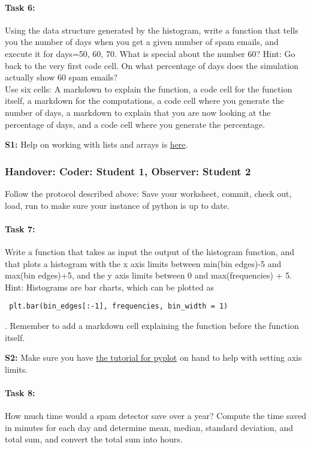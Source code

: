 \documentclass{article}
\begin{document}
\paragraph{Task 6:} Using the data structure generated by the histogram, write a function that tells you the number of days when you get a given number of spam emails, and execute it for days=50, 60, 70. What is special about the number 60? Hint: Go back to the very first code cell. On what percentage of days does the simulation actually show 60 spam emails?   \\
Use six cells: A markdown to explain the function, a code cell for the function itself, a markdown for the computations, a code cell where you generate the number of days, a markdown to explain that you are now looking at the percentage of days, and a code cell where you generate the percentage. 

\textbf{S1:} Help on working with lists and arrays is \href{https://docs.python.org/2/tutorial/datastructures.html#more-on-lists}{here}.


\subsubsection*{Handover: Coder: Student 1, Observer: Student 2}
Follow the protocol described above: Save your worksheet, commit, check out, load, run to make sure your instance of python is up to date. 

\paragraph{Task 7:} Write a function that takes as input the output of the histogram function, and that plots a histogram with the x axis limits between min(bin edges)-5 and max(bin edges)+5, and the y axis limits between 0 and max(frequencies) + 5.\\
Hint: Histograms are bar charts, which can be plotted as \begin{verbatim} plt.bar(bin_edges[:-1], frequencies, bin_width = 1) \end{verbatim}. Remember to add a markdown cell explaining the function before the function itself.

\textbf{S2:} Make sure you have \href{http://matplotlib.org/users/pyplot_tutorial.html}{the tutorial for pyplot} on hand to help with setting axis limits. 

\paragraph{Task 8:} How much time would a spam detector save over a year? Compute the time saved in minutes for each day and determine mean, median, standard deviation, and total sum, and convert the total sum into hours.
\end{document}
